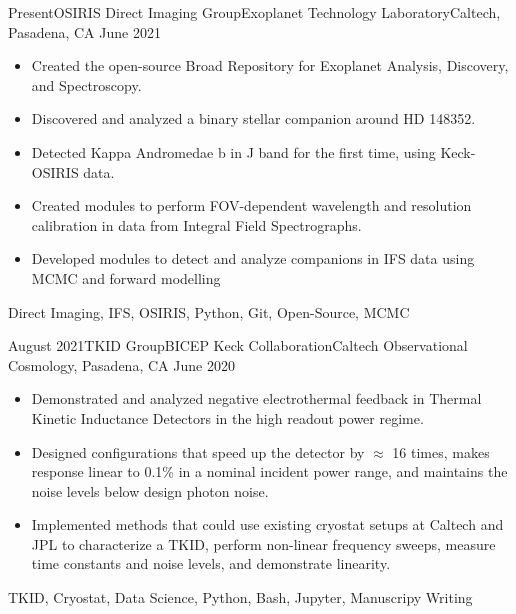 \begin{experiences}
\experience
{Present}{OSIRIS Direct Imaging Group}{Exoplanet Technology Laboratory}{Caltech, Pasadena, CA}
{June 2021} {
\begin{itemize}
\item Created the open-source Broad Repository for Exoplanet Analysis, Discovery, and Spectroscopy.
\item Discovered and analyzed a binary stellar companion around HD 148352.
\item Detected Kappa Andromedae b in J band for the first time, using Keck-OSIRIS data.
\item Created modules to perform FOV-dependent wavelength and resolution calibration in data from Integral Field Spectrographs.
\item Developed modules to detect and analyze companions in IFS data using MCMC and forward modelling
\end{itemize}
}
{Direct Imaging, IFS, OSIRIS, Python, Git, Open-Source, MCMC}
\end{experiences}
\begin{experiences}
\experience
{August 2021}{TKID Group}{BICEP Keck Collaboration}{Caltech Observational Cosmology, Pasadena, CA}
{June 2020} {
\begin{itemize}
\item Demonstrated and analyzed negative electrothermal feedback in Thermal Kinetic Inductance Detectors in the high readout power regime.
\item Designed configurations that speed up the detector by $\approx$ 16 times, makes response linear to 0.1\% in a nominal incident power range, and maintains the noise levels below design photon noise.
\item Implemented methods that could use existing cryostat setups at Caltech and JPL to characterize a TKID, perform non-linear frequency sweeps, measure time constants and noise levels, and demonstrate linearity. 
\end{itemize}
}
{TKID, Cryostat, Data Science, Python, Bash, Jupyter, Manuscripy Writing}
\end{experiences}
